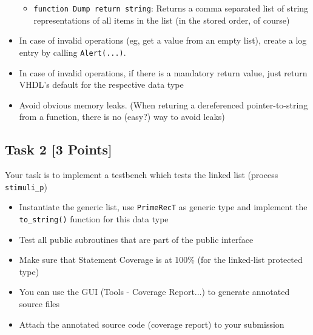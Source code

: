 \documentclass[12pt,epsf,makeidx,oneside]{book}
\begin{document}
\begin{itemize}[noitemsep]
\begin{itemize}[noitemsep]
      \item {\tt function Dump return string}: Returns a comma separated list of string representations of all items in the list (in the stored order, of course)
    \end{itemize}
    \item In case of invalid operations (eg, get a value from an empty list), create a log entry by calling {\tt Alert(...)}. 
    \item In case of invalid operations, if there is a mandatory return value, just return VHDL's default for the respective data type
    \item Avoid obvious memory leaks. (When returing a dereferenced pointer-to-string from a function, there is no (easy?) way to avoid leaks)
  \end{itemize}

  \subsection{Task 2 [3 Points]}
  Your task is to implement a testbench which tests the linked list (process {\tt stimuli\_p})
  \begin{itemize}[noitemsep]
    \item Instantiate the generic list, use {\tt PrimeRecT} as generic type and implement the {\tt to\_string()} function for this data type
    \item Test all public subroutines that are part of the public interface
    \item Make sure that Statement Coverage is at 100\% (for the linked-list protected type)
    \item You can use the GUI (Tools - Coverage Report...) to generate annotated source files
    \item Attach the annotated source code (coverage report) to your submission
  \end{itemize}


\end{document}
